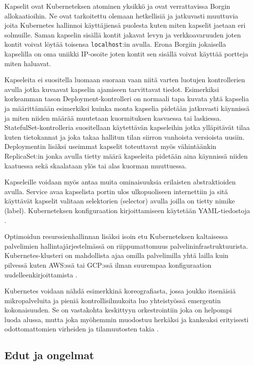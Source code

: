 \documentclass[finnish,gradu]{tktltiki3}
\begin{document}
Kapselit ovat Kuberneteksen atominen yksikkö ja ovat verrattavissa Borgin allokaatioihin. Ne ovat tarkoitettu olemaan hetkellisiä ja jatkuvasti muuttuvia joita Kubernetes hallinnoi käyttäjiensä puolesta kuten miten kapselit jaetaan eri solmuille. Saman kapselin sisällä kontit jakavat levyn ja verkkoavaruuden joten kontit voivat löytää toisensa \texttt{localhost}:in avulla. Erona Borgiin jokaisella kapselilla on oma uniikki IP-osoite joten kontit sen sisällä voivat käyttää portteja miten haluavat.

Kapseleita ei suositella luomaan suoraan vaan niitä varten luotujen kontrollerien avulla jotka kuvaavat kapselin ajamiseen tarvittavat tiedot. Esimerkiksi korkeamman tason Deployment-kontrolleri on normaali tapa kuvata yhtä kapselia ja määrittämään esimerkiksi kuinka monta kapselia pidetään jatkuvasti käynnissä ja miten niiden määrää muutetaan kuormituksen kasvaessa tai laskiessa. StatefulSet-kontrolleria suositellaan käytettävän kapseleihin jotka ylläpitävät tilaa kuten tietokannat ja joka takaa hallitun tilan siirron vanhoista versioista uusiin. Deploymentin lisäksi useimmat kapselit toteuttavat myös vähintäänkin ReplicaSet:in jonka avulla tietty määrä kapseleita pidetään aina käynnissä niiden kaatuessa sekä skaalataan ylös tai alas kuorman muuttuessa.

Kapseleille voidaan myös antaa muita ominaisuuksia erilaisten abstraktioiden avulla. Service avaa kapselista portin ulos ulkopuoliseen internettiin ja sitä käyttävät kapselit valitaan selektorien (selector) avulla joilla on tietty nimike (label). Kuberneteksen konfiguraation kirjoittamiseen käytetään YAML-tiedostoja \cite{kubernetes-docs}.

Optimoidun resurssienhallinnan lisäksi isoin etu Kuberneteksen kaltaisessa palvelimien hallintajärjestelmässä on riippumattomuus palvelininfrastruktuurista. Kubernetes-klusteri on mahdollista ajaa omilla palvelimilla yhtä lailla kuin pilvessä kuten AWS:ssä tai GCP:ssä ilman suurempaa konfiguraation uudelleenkirjoittamista \cite{kubernetes-rule-world}.

Kubernetes voidaan nähdä esimerkkinä koreografiasta, jossa joukko itsenäisiä mikropalveluita ja pieniä kontrollisilmukoita luo yhteistyössä emergentin kokonaisuuden. Se on vastakohta keskittyyn orkestrointiin joka on helpompi luoda alussa, mutta joka myöhemmin muodostuu herkäksi ja kankeaksi erityisesti odottomattomien virheiden ja tilamuutosten takia \cite{borg-omega-kubernetes}.

\subsection{Edut ja ongelmat}
\end{document}
